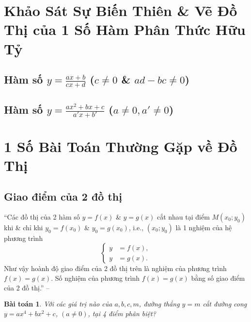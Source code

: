 \documentclass[oneside]{book}
\numberwithin{equation}{section}
\newtheorem{baitoan}{Bài toán}[section]
\begin{document}
\section{Khảo Sát Sự Biến Thiên \& Vẽ Đồ Thị của 1 Số Hàm Phân Thức Hữu Tỷ}

\subsection{Hàm số $y = \frac{ax + b}{cx + d}$ ($c\ne 0$ \& $ad - bc\ne 0$)}

\subsection{Hàm số $y = \frac{ax^2 + bx + c}{a'x + b'}$ ($a\ne 0,a'\ne 0$)}


\section{1 Số Bài Toán Thường Gặp về Đồ Thị}

\subsection{Giao điểm của 2 đồ thị}
``Các đồ thị của 2 hàm số $y = f(x)$ \& $y = g(x)$ cắt nhau tại điểm $M(x_0;y_0)$ khi \& chỉ khi $y_0 = f(x_0)$ \& $y_0 = g(x_0)$, i.e., $(x_0;y_0)$ là 1 nghiệm của hệ phương trình
\begin{equation*}
	\left\{\begin{split}
		y &= f(x),\\
		y &= g(x).
	\end{split}\right.
\end{equation*}
Như vậy hoành độ giao điểm của 2 đồ thị trên là nghiệm của phương trình $f(x) = g(x)$. Số nghiệm của phương trình $f(x) = g(x)$ bằng số giao điểm của 2 đồ thị.'' -- \cite[p. 51]{SGK_Toan_12_giai_tich_nang_cao}

\begin{baitoan}
	Với các giá trị nào của $a,b,c,m$, đường thẳng $y = m$ cắt đường cong $y = ax^4 + bx^2 + c$, $(a\ne 0)$, tại 4 điểm phân biệt?
\end{baitoan}
\end{document}
